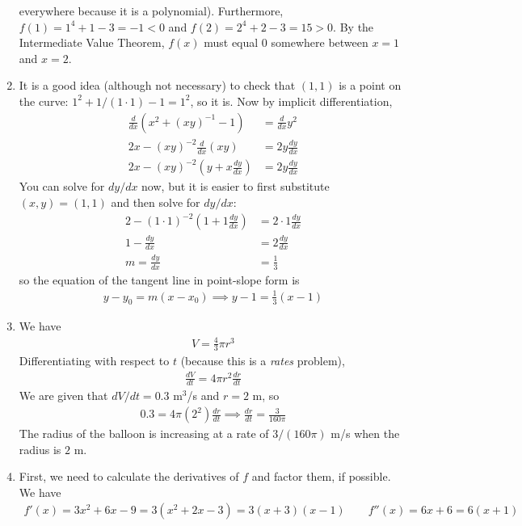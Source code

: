 \documentclass{article}
\begin{document}
\begin{enumerate}
  everywhere because it is a polynomial).  Furthermore, $f(1)=1^4+1-3=-1<0$
  and $f(2)=2^4+2-3=15>0$.  By the Intermediate Value Theorem, $f(x)$
  must equal $0$ somewhere between $x=1$ and $x=2$.
\item It is a good idea (although not necessary) to check that $(1,1)$ is
  a point on the curve: $1^2+1/(1\cdot 1) -1 = 1^2$, so it is.  
  Now by implicit differentiation,
  \begin{align*}
    \frac{d}{dx} \left( x^2 + (xy)^{-1} -1 \right)
    &= \frac{d}{dx} y^2
    \\
    2x - (xy)^{-2} \frac{d}{dx} (xy) &= 2y \frac{dy}{dx}
    \\
    2x - (xy)^{-2} \left(y + x\frac{dy}{dx}\right) &= 2y \frac{dy}{dx}
  \end{align*}
  You can solve for $dy/dx$ now, but it is easier to first substitute
  $(x,y)=(1,1)$ and then solve for $dy/dx$:
  \begin{align*}
    2-(1\cdot 1)^{-2} \left(1+1\frac{dy}{dx}\right) &= 2\cdot 1 \frac{dy}{dx}
    \\
    1-\frac{dy}{dx} &= 2\frac{dy}{dx}
    \\
    m = \frac{dy}{dx} &= \frac{1}{3}
  \end{align*}
  so the equation of the tangent line in point-slope form is
  \begin{align*}
    y-y_0 = m(x-x_0) \implies y-1 = \frac{1}{3} (x-1)
  \end{align*}
\item We have
  \begin{align*}
    V = \frac{4}{3} \pi r^3
  \end{align*}
  Differentiating with respect to $t$ (because this is a \textit{rates}
  problem),
  \begin{align*}
    \frac{dV}{dt} = 4 \pi r^2 \frac{dr}{dt}
  \end{align*}
  We are given that $dV/dt=0.3$ m$^3$/s and $r=2$ m, so
  \begin{align*}
    0.3 = 4\pi (2^2) \frac{dr}{dt}
    \implies \frac{dr}{dt} = \frac{3}{160\pi}
  \end{align*}
  The radius of the balloon is increasing at a rate of $3/(160\pi)$ m/s
  when the radius is $2$ m.
\item First, we need to calculate the derivatives of $f$ and factor them,
  if possible.  We have
  \begin{align*}
    f'(x) = 3x^2+6x-9=3(x^2+2x-3)=3(x+3)(x-1)
    \qquad
    f''(x) = 6x+6 = 6(x+1)
  \end{align*}

\end{enumerate}
\end{document}
